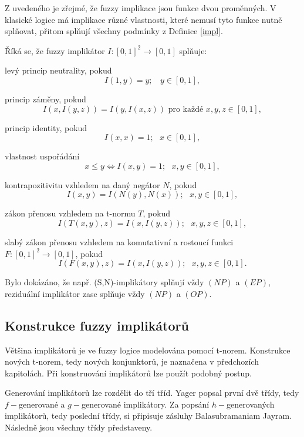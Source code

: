 Z uveden\'eho je z\v rejm\'e, \v ze fuzzy implikace jsou funkce dvou prom\v enn\'ych.
V klasick\'e logice m\'a implikace r\r uzn\'e vlastnosti, kter\'e nemus\'i tyto funkce nutn\v e spl\v novat, p\v ritom spl\v nuj\'i v\v sechny podm\'inky z Definice \ref{impl}.

\begin{definition}
\cite{Springer}
Říká se, že fuzzy implik\'ator $I:[0,1]^2 \rightarrow [0,1]$ spl\v nuje:
\begin{enumerate}
\item[(NP)] levý princip neutrality, pokud
$$I(1,y)=y; ~~~~y \in [0,1],$$
\item[(EP)] princip z\'aměny, pokud
$$I(x,I(y,z))=I(y,I(x,z)) \mbox{  pro ka\v zd\'e   } x,y,z \in [0,1],$$
\item[(IP)] princip identity, pokud
$$I(x,x) = 1; ~~~ x \in [0,1], $$
\item[(OP)] vlastnost uspořádání
$$x \leq y \iff I(x,y) =1; ~~~ x,y \in [0,1],$$
\item[(CP)] kontrapozitivitu vzhledem na dan\'y neg\'ator $N$, pokud
$$ I(x,y)=I(N(y),N(x)); ~~~ x,y \in [0,1],$$
 {\item[(LI)] z\'akon přenosu  vzhledem na  t-normu $T$, pokud
$$I(T(x, y), z) = I(x, I(y, z)); ~~~ x,y,z \in  [0, 1],$$
\item[(WLI)]  slab\'y z\'akon přenosu vzhledem na komutativní a
rostoucí funkci $F:
[0,1]^2 \to [0, 1]$, pokud
$$I(F(x, y), z) = I(x, I(y, z)); ~~~  x,y,z \in  [0, 1].$$}
\end{enumerate}
\end{definition}

\begin{remark}
    Bylo dok\'az\'ano, \v ze nap\v r. (S,N)-implikátory spl\v nují v\v zdy $(NP)$ a $(EP)$, reziduální implikátor zase spl\v nuje v\v zdy $(NP)$ a $(OP).$
\end{remark}

\subsection{Konstrukce fuzzy implikátor\r u}

Většina implikátor\r u je ve fuzzy logice modelována pomocí t-norem. Konstrukce nových t-norem, tedy nových konjunktor\r u, je naznačena v předchozích kapitolách. Při konstruování implikátor\r u lze použít podobný postup.

Generování implikátor\r u lze rozdělit do tří tříd. Yager popsal první dvě třídy, tedy $f-$generované a $g-$generované implikátory. Za popsání  $h-$generovaných implikátor\r u, tedy poslední třídy, si připisuje zásluhy Balasubramaniam Jayram. Následně jsou všechny třídy představeny.

